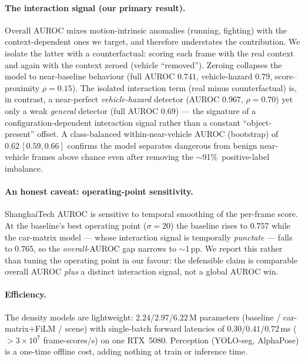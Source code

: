 \paragraph{The interaction signal (our primary result).}
Overall AUROC mixes motion-intrinsic anomalies (running, fighting) with the
context-dependent ones we target, and therefore understates the contribution. We
isolate the latter with a counterfactual: scoring each frame with the real
context and again with the context zeroed (vehicle ``removed''). Zeroing collapses
the model to near-baseline behaviour (full AUROC $0.741$, vehicle-hazard $0.79$,
score--proximity $\rho{=}0.15$). The isolated interaction term (real minus
counterfactual) is, in contrast, a near-perfect \emph{vehicle-hazard} detector
(AUROC $0.967$, $\rho{=}0.70$) yet only a weak \emph{general} detector
(full AUROC $0.69$) --- the signature of a configuration-dependent interaction
signal rather than a constant ``object-present'' offset. A class-balanced
within-near-vehicle AUROC (bootstrap) of $0.62\,[0.59,0.66]$ confirms the model
separates dangerous from benign near-vehicle frames above chance even after
removing the $\sim$91\%\ positive-label imbalance.

\paragraph{An honest caveat: operating-point sensitivity.}
ShanghaiTech AUROC is sensitive to temporal smoothing of the per-frame score. At
the baseline's best operating point ($\sigma{=}20$) the baseline rises to
$0.757$ while the car-matrix model --- whose interaction signal is temporally
\emph{punctate} --- falls to $0.765$, so the \emph{overall}-AUROC gap narrows to
$\sim$1\,pp. We report this rather than tuning the operating point in our favour:
the defensible claim is comparable overall AUROC \emph{plus} a distinct
interaction signal, not a global AUROC win.

\paragraph{Efficiency.}
The density models are lightweight: $2.24$/$2.97$/$6.22$\,M parameters
(baseline / car-matrix$+$FiLM / scene) with single-batch forward latencies of
$0.30$/$0.41$/$0.72$\,ms ($>\!3\times10^{7}$ frame-scores/s) on one RTX~5080.
Perception (YOLO-seg, AlphaPose) is a one-time offline cost, adding nothing at
train or inference time.
